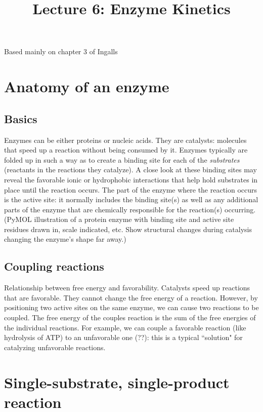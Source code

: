 \documentclass{article}
\begin{document}
\large

\title{Lecture 6: Enzyme Kinetics}
\maketitle

Based mainly on chapter 3 of Ingalls

\section*{Anatomy of an enzyme}

\subsection*{Basics}

Enzymes can be either proteins or nucleic acids. They are catalysts: molecules that speed up a reaction without being consumed by it. Enzymes typically are folded up in such a way as to create a binding site for each of the \textit{substrates} (reactants in the reactions they catalyze). A close look at these binding sites may reveal the favorable ionic or hydrophobic interactions that help hold substrates in place until the reaction occurs. The part of the enzyme where the reaction occurs is the active site: it normally includes the binding site(s) as well as any additional parts of the enzyme that are chemically responsible for the reaction(s) occurring. (PyMOL illustration of a protein enzyme with binding site and active site residues drawn in, scale indicated, etc. Show structural changes during catalysis changing the enzyme's shape far away.)

\subsection*{Coupling reactions}
Relationship between free energy and favorability. Catalysts speed up reactions that are favorable. They cannot change the free energy of a reaction. However, by positioning two active sites on the same enzyme, we can cause two reactions to be coupled. The free energy of the couples reaction is the sum of the free energies of the individual reactions. For example, we can couple a favorable reaction (like hydrolysis of ATP) to an unfavorable one (??): this is a typical ``solution" for catalyzing unfavorable reactions.


\section*{Single-substrate, single-product reaction}
\end{document}
